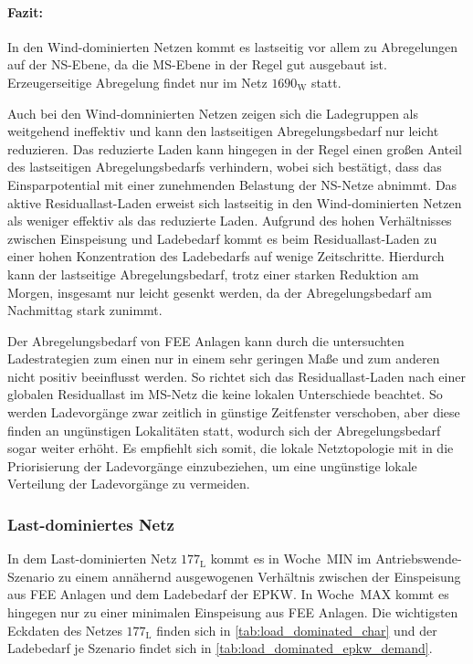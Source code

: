 \paragraph{Fazit:}

In den Wind-dominierten Netzen kommt es lastseitig vor allem zu Abregelungen auf der \gls{NS}-Ebene, da die \gls{MS}-Ebene in der Regel gut ausgebaut ist.
Erzeugerseitige Abregelung findet nur im Netz \(1690_{\text{W}}\) statt.\medskip

Auch bei den Wind-domninierten Netzen zeigen sich die Ladegruppen als weitgehend ineffektiv und kann den lastseitigen Abregelungsbedarf nur leicht reduzieren.
Das reduzierte Laden kann hingegen in der Regel einen großen Anteil des lastseitigen Abregelungsbedarfs verhindern, wobei sich bestätigt, dass das Einsparpotential mit einer zunehmenden Belastung der \gls{NS}-Netze abnimmt.
Das aktive Residuallast-Laden erweist sich lastseitig in den Wind-dominierten Netzen als weniger effektiv als das reduzierte Laden.
Aufgrund des hohen Verhältnisses zwischen Einspeisung und Ladebedarf kommt es beim Residuallast-Laden zu einer hohen Konzentration des Ladebedarfs auf wenige Zeitschritte.
Hierdurch kann der lastseitige Abregelungsbedarf, trotz einer starken Reduktion am Morgen, insgesamt nur leicht gesenkt werden, da der Abregelungsbedarf am Nachmittag stark zunimmt.\medskip

Der Abregelungsbedarf von \gls{FEE} Anlagen kann durch die untersuchten Ladestrategien zum einen nur in einem sehr geringen Maße und zum anderen nicht positiv beeinflusst werden.
So richtet sich das Residuallast-Laden nach einer globalen Residuallast im \gls{MS}-Netz die keine lokalen Unterschiede beachtet.
So werden Ladevorgänge zwar zeitlich in günstige Zeitfenster verschoben, aber diese finden an ungünstigen Lokalitäten statt, wodurch sich der Abregelungsbedarf sogar weiter erhöht.
Es empfiehlt sich somit, die lokale Netztopologie mit in die Priorisierung der Ladevorgänge einzubeziehen, um eine ungünstige lokale Verteilung der Ladevorgänge zu vermeiden.


\subsubsection{Last-dominiertes Netz}

In dem Last-dominierten Netz \(177_{\text{L}}\) kommt es in Woche~MIN im Antriebswende-Szenario zu einem annähernd ausgewogenen Verhältnis zwischen der Einspeisung aus \gls{FEE} Anlagen und dem Ladebedarf der \gls{EPKW}.
In Woche~MAX kommt es hingegen nur zu einer minimalen Einspeisung aus \gls{FEE} Anlagen.
Die wichtigsten Eckdaten des Netzes \(177_{\text{L}}\) finden sich in \autoref{tab:load_dominated_char} und der Ladebedarf je Szenario findet sich in \autoref{tab:load_dominated_epkw_demand}.

